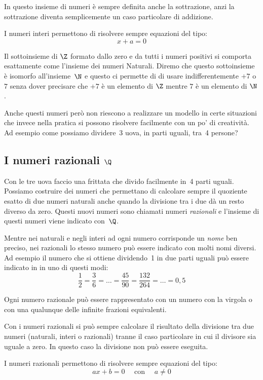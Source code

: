 In questo insieme di numeri è sempre definita anche la sottrazione, anzi la 
sottrazione diventa semplicemente un caso particolare di addizione.

I numeri interi permettono di risolvere sempre equazioni del tipo:
\[x+a=0\]

Il sottoinsieme di \(\Z\) formato dallo zero e da tutti i numeri positivi
si comporta esattamente come l'insieme dei numeri Naturali. Diremo che 
questo sottoinsieme è isomorfo all'insieme~\(\N\) 
e questo ci permette di di usare indifferentemente \(+7\) o \(7\) 
senza dover precisare che \(+7\) è un elemento di \(\Z\) 
mentre \(7\) è un elemento di \(\N\).

Anche questi numeri però non riescono a realizzare un modello in certe 
situazioni che invece nella pratica si possono risolvere facilmente con un 
po' di creatività. Ad esempio come possiamo dividere~3 uova, in parti 
uguali, tra~4 persone?

\subsection{I numeri razionali \(\Q\)}
\label{subsec:insnum_razionali}

Con le tre uova faccio una frittata che divido facilmente in~4 parti 
uguali. 
Possiamo costruire dei numeri che permettano di calcolare sempre il 
quoziente esatto di due numeri naturali anche quando la divisione tra i due 
dà un resto diverso da zero. 
Questi nuovi numeri sono chiamati numeri \emph{razionali} 
e l'insieme di questi numeri viene indicato con~\(\Q\).

Mentre nei naturali e negli interi ad ogni numero corrisponde un 
\emph{nome} ben preciso, nei razionali lo stesso numero può essere indicato 
con molti nomi diversi. 
Ad esempio il numero che si ottiene dividendo~1 in due parti 
uguali può essere indicato in in uno di questi modi:
\[\frac{1}{2}=\frac{3}{6}=\dots=\frac{45}{90}=\frac{132}{264}=\dots=0,5\]

Ogni numero razionale può essere rappresentato con un numero con la virgola 
o con una qualunque delle infinite frazioni equivalenti.

Con i numeri razionali si può sempre calcolare il risultato della divisione 
tra due numeri (naturali, interi o razionali) tranne il caso particolare in 
cui il divisore sia uguale a zero. 
In questo caso la divisione non può essere eseguita.

I numeri razionali permettono di risolvere sempre equazioni del tipo:
\[ax+b=0 \quad \text{ con } \quad a \neq 0\]

